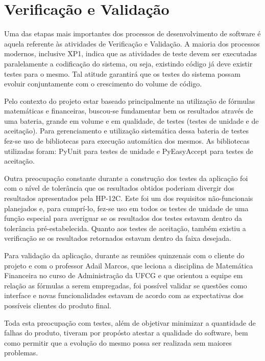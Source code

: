 \chapter{Verificação e Validação}

Uma das etapas mais importantes dos processos de desenvolvimento de software é aquela referente às atividades de Verificação e Validação. A maioria dos processos modernos, inclusive XP1, indica que as atividades de teste devem ser executadas paralelamente a codificação do sistema, ou seja, existindo código já deve existir testes para o mesmo. Tal atitude garantirá que os testes do sistema possam evoluir conjuntamente com o crescimento do volume de código.

Pelo contexto do projeto estar baseado principalmente na utilização de fórmulas matemáticas e financeiras, buscou-se fundamentar bem os resultados através de uma bateria, grande em volume e em qualidade, de testes (testes de unidade e de aceitação). Para gerenciamento e utilização sistemática dessa bateria de testes fez-se uso de bibliotecas para execução automática dos mesmos. As bibliotecas utilizadas foram: PyUnit para testes de unidade e PyEasyAccept para testes de aceitação.

Outra preocupação constante durante a construção dos testes da aplicação foi com o nível de tolerância que os resultados obtidos poderiam divergir dos resultados apresentados pela HP-12C. Este foi um dos requisitos não-funcionais planejados e, para cumprí-lo, fez-se uso em todos os testes de unidade de uma função especial para averiguar se os resultados dos testes estavam dentro da tolerância pré-estabelecida. Quanto aos testes de aceitação, também existiu a verificação se os resultados retornados estavam dentro da faixa desejada.

Para validação da aplicação, durante as reuniões quinzenais com o cliente do projeto e com o professor Adail Marcos, que leciona a disciplina de Matemática Financeira no curso de Administração da UFCG e que orientou a equipe em relação as fórmulas a serem empregadas, foi possível validar se questões como interface e novas funcionalidades estavam de acordo com as expectativas dos possíveis clientes do produto final.

Toda esta preocupação com testes, além de objetivar minimizar a quantidade de falhas do produto, tiveram por propósto atestar a qualidade do software, bem como permitir que a evolução do mesmo possa ser realizada sem maiores problemas.


